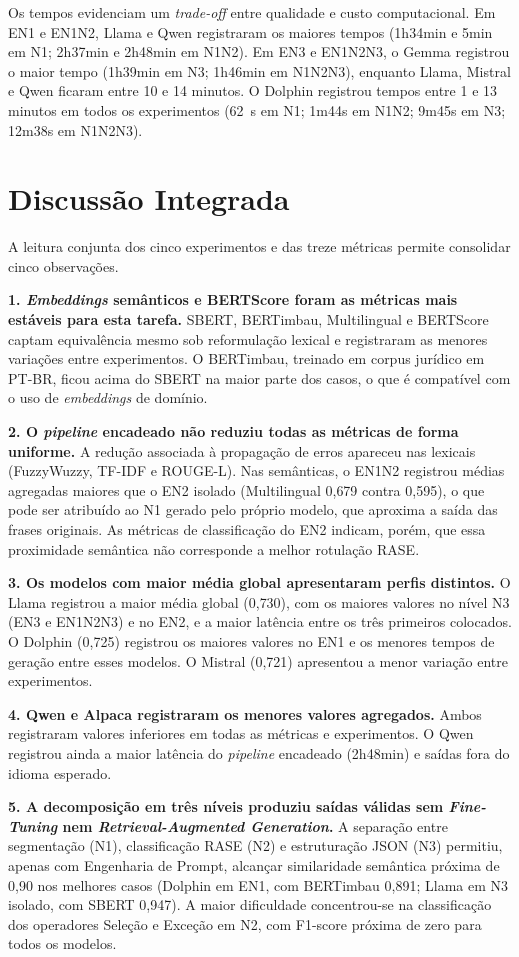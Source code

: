 Os tempos evidenciam um \textit{trade-off} entre qualidade e custo computacional. Em EN1 e EN1N2, Llama e Qwen registraram os maiores tempos (1h34min e 5min em N1; 2h37min e 2h48min em N1N2). Em EN3 e EN1N2N3, o Gemma registrou o maior tempo (1h39min em N3; 1h46min em N1N2N3), enquanto Llama, Mistral e Qwen ficaram entre 10 e 14 minutos. O Dolphin registrou tempos entre 1 e 13 minutos em todos os experimentos (62~s em N1; 1m44s em N1N2; 9m45s em N3; 12m38s em N1N2N3).

\section{Discussão Integrada}
\label{sec:discussao}

A leitura conjunta dos cinco experimentos e das treze métricas permite consolidar cinco observações.

\textbf{1. \textit{Embeddings} semânticos e BERTScore foram as métricas mais estáveis para esta tarefa.} SBERT, BERTimbau, Multilingual e BERTScore captam equivalência mesmo sob reformulação lexical e registraram as menores variações entre experimentos. O BERTimbau, treinado em corpus jurídico em PT-BR, ficou acima do SBERT na maior parte dos casos, o que é compatível com o uso de \textit{embeddings} de domínio.

\textbf{2. O \textit{pipeline} encadeado não reduziu todas as métricas de forma uniforme.} A redução associada à propagação de erros apareceu nas lexicais (FuzzyWuzzy, TF-IDF e ROUGE-L). Nas semânticas, o EN1N2 registrou médias agregadas maiores que o EN2 isolado (Multilingual 0{,}679 contra 0{,}595), o que pode ser atribuído ao N1 gerado pelo próprio modelo, que aproxima a saída das frases originais. As métricas de classificação do EN2 indicam, porém, que essa proximidade semântica não corresponde a melhor rotulação RASE.

\textbf{3. Os modelos com maior média global apresentaram perfis distintos.} O Llama registrou a maior média global (0{,}730), com os maiores valores no nível N3 (EN3 e EN1N2N3) e no EN2, e a maior latência entre os três primeiros colocados. O Dolphin (0{,}725) registrou os maiores valores no EN1 e os menores tempos de geração entre esses modelos. O Mistral (0{,}721) apresentou a menor variação entre experimentos.

\textbf{4. Qwen e Alpaca registraram os menores valores agregados.} Ambos registraram valores inferiores em todas as métricas e experimentos. O Qwen registrou ainda a maior latência do \textit{pipeline} encadeado (2h48min) e saídas fora do idioma esperado.

\textbf{5. A decomposição em três níveis produziu saídas válidas sem \textit{Fine-Tuning} nem \textit{Retrieval-Augmented Generation}.} A separação entre segmentação (N1), classificação RASE (N2) e estruturação JSON (N3) permitiu, apenas com Engenharia de Prompt, alcançar similaridade semântica próxima de 0{,}90 nos melhores casos (Dolphin em EN1, com BERTimbau 0{,}891; Llama em N3 isolado, com SBERT 0{,}947). A maior dificuldade concentrou-se na classificação dos operadores Seleção e Exceção em N2, com F1-score próxima de zero para todos os modelos.
